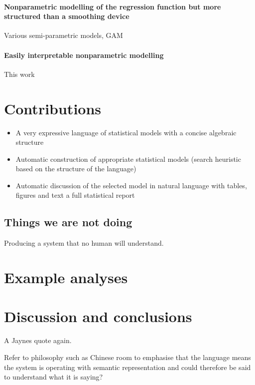 \documentclass[twoside]{article}
\begin{document}
\paragraph{Nonparametric modelling of the regression function but more structured than a smoothing device}

Various semi-parametric models, GAM

\paragraph{Easily interpretable nonparametric modelling}

This work

\section{Contributions}

\begin{itemize}
  \item A very expressive language of statistical models with a concise algebraic structure
  \item Automatic construction of appropriate statistical models (search heuristic based on the structure of the language)
  \item Automatic discussion of the selected model in natural language with tables, figures and text \ie a full statistical report
\end{itemize}

\subsection{Things we are not doing}

Producing a system that no human will understand.

\section{Example analyses}

\section{Discussion and conclusions}

A Jaynes quote again.

Refer to philosophy such as Chinese room to emphasise that the language means the system is operating with semantic representation and could therefore be said to understand what it is saying?
\end{document}
